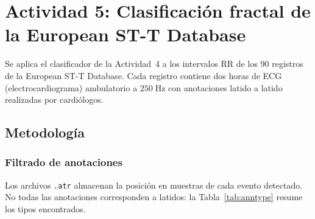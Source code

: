 \newpage
\section{Actividad 5: Clasificación fractal de la European ST-T Database}

Se aplica el clasificador de la Actividad~4 a los intervalos RR de los 90
registros de la European ST-T Database. Cada registro contiene dos horas de
ECG (electrocardiograma) ambulatorio a $250\;\text{Hz}$ con anotaciones latido a latido
realizadas por cardiólogos.

\subsection{Metodología}

\subsubsection{Filtrado de anotaciones}

Los archivos \texttt{.atr} almacenan la posición en muestras de cada evento
detectado. No todas las anotaciones corresponden a latidos: la
Tabla~\ref{tab:anntype} resume los tipos encontrados.

